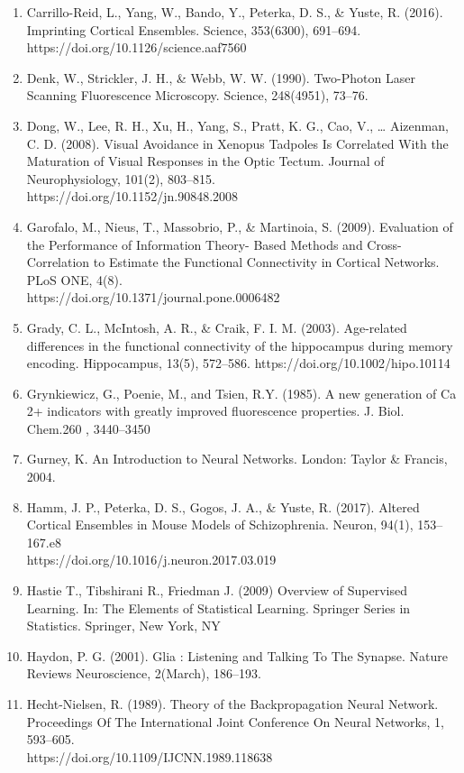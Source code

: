 \documentclass[11pt]{article}
\begin{document}
\begin{enumerate}
\item Carrillo-Reid, L., Yang, W., Bando, Y., Peterka, D. S., \& Yuste, R. (2016). Imprinting Cortical Ensembles. Science, 353(6300), 691–694. https://doi.org/10.1126/science.aaf7560
\item Denk, W., Strickler, J. H., \& Webb, W. W. (1990). Two-Photon Laser Scanning Fluorescence Microscopy. Science, 248(4951), 73–76.
\item Dong, W., Lee, R. H., Xu, H., Yang, S., Pratt, K. G., Cao, V., … Aizenman, C. D. (2008). Visual Avoidance in Xenopus Tadpoles Is Correlated With the Maturation of Visual Responses in the Optic Tectum. Journal of Neurophysiology, 101(2), 803–815.\\https://doi.org/10.1152/jn.90848.2008
\item Garofalo, M., Nieus, T., Massobrio, P., \& Martinoia, S. (2009). Evaluation of the Performance of Information Theory- Based Methods and Cross-Correlation to Estimate the Functional Connectivity in Cortical Networks. PLoS ONE, 4(8).\\https://doi.org/10.1371/journal.pone.0006482
\item Grady, C. L., McIntosh, A. R., \& Craik, F. I. M. (2003). Age-related differences in the functional connectivity of the hippocampus during memory encoding. Hippocampus, 13(5), 572–586. https://doi.org/10.1002/hipo.10114
\item Grynkiewicz, G., Poenie, M., and Tsien, R.Y. (1985). A new generation of Ca 2+ indicators with greatly improved fluorescence properties. J. Biol. Chem.260 , 3440–3450
\item Gurney, K. An Introduction to Neural Networks. London: Taylor \& Francis, 2004.
\item Hamm, J. P., Peterka, D. S., Gogos, J. A., \& Yuste, R. (2017). Altered Cortical Ensembles in Mouse Models of Schizophrenia. Neuron, 94(1), 153–167.e8\\https://doi.org/10.1016/j.neuron.2017.03.019
\item Hastie T., Tibshirani R., Friedman J. (2009) Overview of Supervised Learning. In: The Elements of Statistical Learning. Springer Series in Statistics. Springer, New York, NY
\item Haydon, P. G. (2001). Glia : Listening and Talking To The Synapse. Nature Reviews Neuroscience, 2(March), 186–193.
\item Hecht-Nielsen, R. (1989). Theory of the Backpropagation Neural Network. Proceedings Of The International Joint Conference On Neural Networks, 1, 593–605.\\https://doi.org/10.1109/IJCNN.1989.118638

\end{enumerate}
\end{document}
